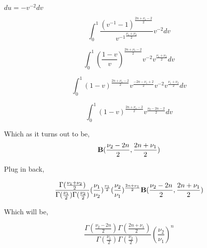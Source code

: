\documentclass{article}
\begin{document}
$du = -v^{-2} dv$

$$\int_{0}^{1} \frac{(v^{-1}-1)^{\frac{2n+\nu_1-2}{2}}}{{v^{-1}}^{\frac{\nu_1+\nu_2}{2}}}v^{-2} dv$$

$$\int_{0}^{1} (\frac{1-v}{v})^{\frac{2n+\nu_1-2}{2}}v^{-2} {{{v}^{\frac{\nu_1+\nu_2}{2}}}} dv$$

$$\int_{0}^{1} ({1-v})^{\frac{2n+\nu_1-2}{2}}v^{\frac{-2n-\nu_1+2}{2}}v^{-2} {{{v}^{\frac{\nu_1+\nu_2}{2}}}} dv$$

$$\int_{0}^{1} ({1-v})^{\frac{2n+\nu_1-2}{2}}v^{\frac{\nu_2-2n-2}{2}}{} dv$$

Which as it turns out to be, 
$${\bf B}(\frac{\nu_2-2n}{2},\frac{2n+\nu_1}{2})$$

Plug in back,

$$\frac{\Gamma(\frac{\nu_1+\nu_2}{2})}{\Gamma(\frac{\nu_1}{2})\Gamma(\frac{\nu_2}{2})} (\frac{\nu_1}{\nu_2})^{\frac{\nu_1}{2}}(\frac{\nu_2}{\nu_1})^{\frac{2n+\nu_1}{2}} {\bf B}(\frac{\nu_2-2n}{2},\frac{2n+\nu_1}{2})$$

Which will be,

$$\frac{\Gamma(\frac{\nu_2-2n}{2})\Gamma(\frac{2n+\nu_1}{2})}{\Gamma(\frac{\nu_1}{2})\Gamma(\frac{\nu_2}{2})} (\frac{\nu_2}{\nu_1})^{n} $$
\end{document}
